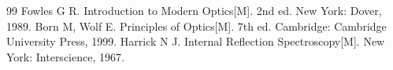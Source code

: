 \begin{thebibliography}{99}
 Fowles G R. Introduction to Modern Optics[M]. 2nd ed. New York: Dover, 1989.
 Born M, Wolf E. Principles of Optics[M]. 7th ed. Cambridge: Cambridge University Press, 1999.
 Harrick N J. Internal Reflection Spectroscopy[M]. New York: Interscience, 1967.
\end{thebibliography}
